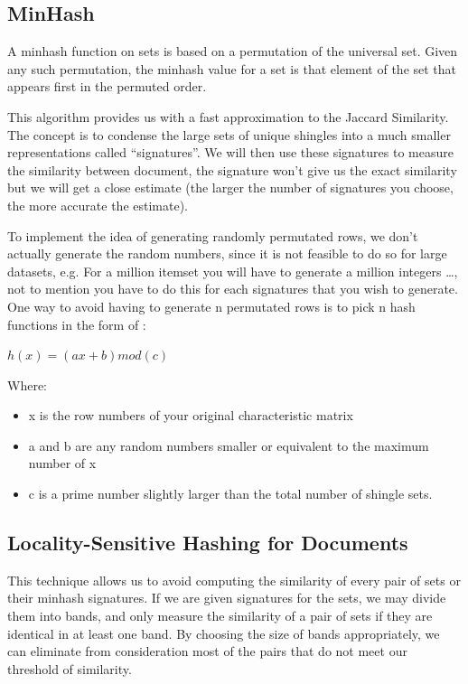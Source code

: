 \documentclass[12pt]{article}
\begin{document}
\subsection{MinHash}

A minhash function on sets is based on a permutation of the universal set. Given any such permutation, the minhash value for a set is that element of the set that appears first in the permuted order. 

This algorithm provides us with a fast approximation to the Jaccard Similarity. The concept is to condense the large sets of unique shingles into a much smaller representations called ``signatures''. We will then use these signatures to measure the similarity between document, the signature won't give us the exact similarity but we will get a close estimate (the larger the number of signatures you choose, the more accurate the estimate).
\\ \medskip


To implement the idea of generating randomly permutated rows, we don’t actually generate the random numbers, since it is not feasible to do so for large datasets, e.g. For a million itemset you will have to generate a million integers …, not to mention you have to do this for each signatures that you wish to generate. One way to avoid having to generate n permutated rows is to pick n hash functions in the form of :
\medbreak
\begin{center}
$ h(x)=(ax+b) mod(c)$
\end{center}

Where: 
\begin{itemize}
\item x is the row numbers of your original characteristic matrix
\item a and b are any random numbers smaller or equivalent to the maximum number of x 
\item c is a prime number slightly larger than the total number of shingle sets. 
\end{itemize}

\subsection{Locality-Sensitive Hashing for Documents}
 This technique allows us to avoid computing the similarity of every pair of sets or their minhash signatures. If we are given signatures for the sets, we may divide them into bands, and only measure the similarity of a pair of sets if they are identical in at least one band. By choosing the size of bands appropriately, we can eliminate from consideration most of the pairs that do not meet our threshold of similarity.
 \medskip 
 
\end{document}
